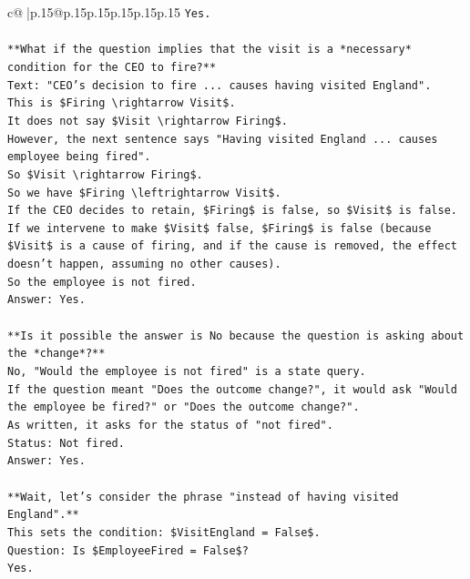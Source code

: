 \documentclass{article}
\begin{document}
{\begin{supertabular}{c@{$\;$}|p{.15\linewidth}@{}p{.15\linewidth}p{.15\linewidth}p{.15\linewidth}p{.15\linewidth}p{.15\linewidth}}
{{{\texttt{Yes.} \\
\\ 
\texttt{**What if the question implies that the visit is a *necessary* condition for the CEO to fire?**} \\
\texttt{Text: "CEO's decision to fire ... causes having visited England".} \\
\texttt{This is \$Firing \textbackslash{}rightarrow Visit\$.} \\
\texttt{It does not say \$Visit \textbackslash{}rightarrow Firing\$.} \\
\texttt{However, the next sentence says "Having visited England ... causes employee being fired".} \\
\texttt{So \$Visit \textbackslash{}rightarrow Firing\$.} \\
\texttt{So we have \$Firing \textbackslash{}leftrightarrow Visit\$.} \\
\texttt{If the CEO decides to retain, \$Firing\$ is false, so \$Visit\$ is false.} \\
\texttt{If we intervene to make \$Visit\$ false, \$Firing\$ is false (because \$Visit\$ is a cause of firing, and if the cause is removed, the effect doesn't happen, assuming no other causes).} \\
\texttt{So the employee is not fired.} \\
\texttt{Answer: Yes.} \\
\\ 
\texttt{**Is it possible the answer is No because the question is asking about the *change*?**} \\
\texttt{No, "Would the employee is not fired" is a state query.} \\
\texttt{If the question meant "Does the outcome change?", it would ask "Would the employee be fired?" or "Does the outcome change?".} \\
\texttt{As written, it asks for the status of "not fired".} \\
\texttt{Status: Not fired.} \\
\texttt{Answer: Yes.} \\
\\ 
\texttt{**Wait, let's consider the phrase "instead of having visited England".**} \\
\texttt{This sets the condition: \$VisitEngland = False\$.} \\
\texttt{Question: Is \$EmployeeFired = False\$?} \\
\texttt{Yes.} \\
\\ 
}}}
\end{supertabular}}
\end{document}
